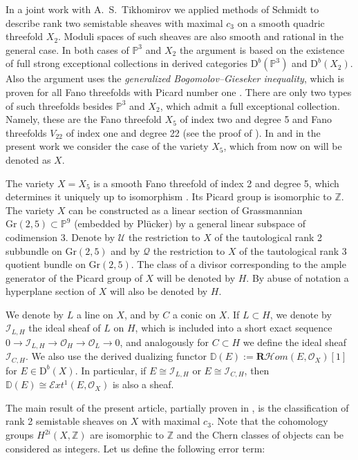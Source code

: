 \documentclass{amsart}
\begin{document}
    In a joint work with A.~S.~Tikhomirov \cite{Fano} we applied methods of Schmidt to describe rank two semistable sheaves with maximal $c_3$ on a smooth quadric threefold $X_2$. Moduli spaces of such sheaves are also smooth and rational in the general case. In both cases of $\mathbb P^3$ and $X_2$ the argument is based on the existence of full strong exceptional collections in derived categories $\mathrm D^b(\mathbb P^3)$ and $\mathrm D^b(X_2)$. Also the argument uses the \textit{generalized Bogomolov--Gieseker inequality}, which is proven for all Fano threefolds with Picard number one \cite{Li}. There are only two types of such threefolds besides $\mathbb P^3$ and $X_2$, which admit a full exceptional collection. Namely, these are the Fano threefold $X_5$ of index two and degree 5 and Fano threefolds $V_{22}$ of index one and degree 22 (see the proof of \cite[Lemma 3.5]{NVdB}). In \cite{Vass} and in the present work we consider the case of the variety $X_5$, which from now on will be denoted as $X$.
	
	The variety $X=X_5$ is a smooth Fano threefold of index 2 and degree 5, which determines it uniquely up to isomorphism \cite{Исковских}. Its Picard group is isomorphic to $\mathbb Z$. The variety $X$ can be constructed as a linear section of Grassmannian $\mathrm{Gr}(2,5)\subset\mathbb P^9$ (embedded by Pl\"ucker) by a general linear subspace of codimension 3. Denote by $\mathcal U$ the restriction to $X$ of the tautological rank 2 subbundle on $\mathrm{Gr}(2,5)$ and by $\mathcal Q$ the restriction to $X$ of the tautological rank 3 quotient bundle on $\mathrm{Gr}(2,5)$. The class of a divisor corresponding to the ample generator of the Picard group of $X$ will be denoted by $H$. By abuse of notation a hyperplane section of $X$ will also be denoted by $H$. 
	
	We denote by $L$ a line on $X$, and by $C$ a conic on $X$. If $L\subset H$, we denote by $\mathcal I_{L,H}$ the ideal sheaf of $L$ on $H$, which is included into a short exact sequence $0\to\mathcal I_{L,H}\to\mathcal O_H\to\mathcal O_L\to 0$, and analogously for $C\subset H$ we define the ideal sheaf $\mathcal I_{C,H}$. We also use the derived dualizing functor $\mathbb D(E):=\mathbf{R}\mathcal{H}om(E,\mathcal O_X)[1]$ for $E\in\mathrm D^b(X)$. In particular, if $E\cong \mathcal I_{L,H}$ or $E\cong \mathcal I_{C,H}$, then $\mathbb D(E)\cong\mathcal Ext^1(E,\mathcal O_X)$ is also a sheaf.
	
	The main result of the present article, partially proven in \cite{Vass}, is the classification of rank 2 semistable sheaves on $X$ with maximal $c_3$. Note that the cohomology groups $H^{2i}(X,\mathbb Z)$ are isomorphic to $\mathbb Z$ and the Chern classes of objects can be considered as integers. Let us define the following error term:
	
\end{document}
